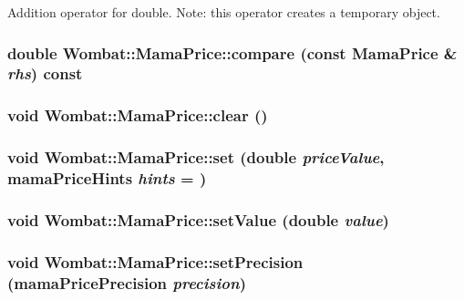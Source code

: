 Addition operator for double. Note: this operator creates a temporary object. \hypertarget{classWombat_1_1MamaPrice_acb33d1386aef08ce9f3fa848dc63afcc}{
\subsubsection[{compare}]{\setlength{\rightskip}{0pt plus 5cm}double Wombat::MamaPrice::compare (const {\bf MamaPrice} \& {\em rhs}) const}}
\label{classWombat_1_1MamaPrice_acb33d1386aef08ce9f3fa848dc63afcc}
\hypertarget{classWombat_1_1MamaPrice_a5f46f98011a5e1ec28c28d175e83a46a}{
\subsubsection[{clear}]{\setlength{\rightskip}{0pt plus 5cm}void Wombat::MamaPrice::clear ()}}
\label{classWombat_1_1MamaPrice_a5f46f98011a5e1ec28c28d175e83a46a}
\hypertarget{classWombat_1_1MamaPrice_a0c7b55f90dde993cc47ffc6b8f78a11a}{
\subsubsection[{set}]{\setlength{\rightskip}{0pt plus 5cm}void Wombat::MamaPrice::set (double {\em priceValue}, \/  mamaPriceHints {\em hints} = {})}}
\label{classWombat_1_1MamaPrice_a0c7b55f90dde993cc47ffc6b8f78a11a}
\hypertarget{classWombat_1_1MamaPrice_af6d547348682f72bdb2b23aee68d5990}{
\subsubsection[{setValue}]{\setlength{\rightskip}{0pt plus 5cm}void Wombat::MamaPrice::setValue (double {\em value})}}
\label{classWombat_1_1MamaPrice_af6d547348682f72bdb2b23aee68d5990}
\hypertarget{classWombat_1_1MamaPrice_ac9d788606dd5f6d5e27cd216a4d504d6}{
\subsubsection[{setPrecision}]{\setlength{\rightskip}{0pt plus 5cm}void Wombat::MamaPrice::setPrecision (mamaPricePrecision {\em precision})}}
